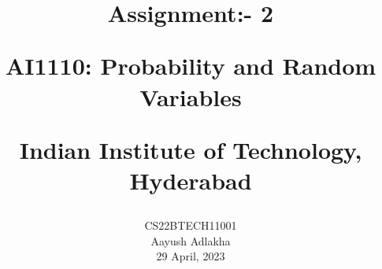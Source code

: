 \documentclass[journal,12pt,twocolumn]{IEEEtran}
\begin{document}
\let\vec\mathbf


\vspace{3cm}

\title{
	Assignment:- 2
 
	\Large AI1110: Probability and Random Variables
 
	\Large Indian Institute of Technology, Hyderabad
}
\author{
	CS22BTECH11001
	
	Aayush Adlakha
 
	29 April, 2023
}






\maketitle

\newpage
\end{document}
